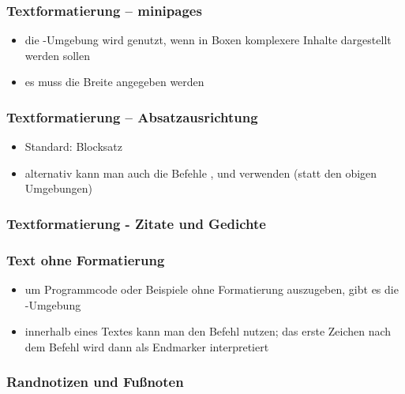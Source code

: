 \begin{frame}[fragile]
	\frametitle{Textformatierung -- minipages}
	\begin{itemize}
		\item die -Umgebung wird genutzt, wenn in Boxen komplexere Inhalte  dargestellt werden sollen
		\item es muss die Breite angegeben werden
	\end{itemize}
\end{frame}

\begin{frame}[fragile]
	\frametitle{Textformatierung -- Absatzausrichtung} \vspace{-0.7cm}
	\vfill
\begin{itemize}
	\item Standard: Blocksatz
	\item alternativ kann man auch die Befehle ,  und  verwenden (statt den obigen Umgebungen)
\end{itemize}
\end{frame}

\begin{frame}[fragile]
	\frametitle{Textformatierung - Zitate und Gedichte}
\end{frame}

\begin{frame}[fragile]
	\frametitle{Text ohne Formatierung}
	\begin{itemize}
		\item um Programmcode oder Beispiele ohne Formatierung auszugeben, gibt es die -Umgebung
		\item innerhalb eines Textes kann man den Befehl  nutzen; das erste Zeichen nach dem Befehl wird dann als Endmarker interpretiert
	\end{itemize}\vfill
\end{frame}

\begin{frame}[fragile]
	\frametitle{Randnotizen und Fußnoten}
\end{frame}